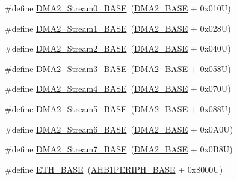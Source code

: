 \begin{DoxyCompactItemize}
\item 
\#define \hyperlink{group___peripheral__memory__map_gac4c67b24726ba6b94d03adb351bcec4d}{D\+M\+A2\+\_\+\+Stream0\+\_\+\+B\+A\+SE}~(\hyperlink{group___peripheral__memory__map_gab72a9ae145053ee13d1d491fb5c1df64}{D\+M\+A2\+\_\+\+B\+A\+SE} + 0x010\+U)
\item 
\#define \hyperlink{group___peripheral__memory__map_ga35512bdc3f5e9df4557c2fbe7935d0b1}{D\+M\+A2\+\_\+\+Stream1\+\_\+\+B\+A\+SE}~(\hyperlink{group___peripheral__memory__map_gab72a9ae145053ee13d1d491fb5c1df64}{D\+M\+A2\+\_\+\+B\+A\+SE} + 0x028\+U)
\item 
\#define \hyperlink{group___peripheral__memory__map_gaed33a06f08188466f2ede06160984e9a}{D\+M\+A2\+\_\+\+Stream2\+\_\+\+B\+A\+SE}~(\hyperlink{group___peripheral__memory__map_gab72a9ae145053ee13d1d491fb5c1df64}{D\+M\+A2\+\_\+\+B\+A\+SE} + 0x040\+U)
\item 
\#define \hyperlink{group___peripheral__memory__map_gaf3a9480e08c6ae94f4482e0cdaebdd17}{D\+M\+A2\+\_\+\+Stream3\+\_\+\+B\+A\+SE}~(\hyperlink{group___peripheral__memory__map_gab72a9ae145053ee13d1d491fb5c1df64}{D\+M\+A2\+\_\+\+B\+A\+SE} + 0x058\+U)
\item 
\#define \hyperlink{group___peripheral__memory__map_gad1e67740e6301233473f64638145dd1f}{D\+M\+A2\+\_\+\+Stream4\+\_\+\+B\+A\+SE}~(\hyperlink{group___peripheral__memory__map_gab72a9ae145053ee13d1d491fb5c1df64}{D\+M\+A2\+\_\+\+B\+A\+SE} + 0x070\+U)
\item 
\#define \hyperlink{group___peripheral__memory__map_gaed1460fdc407b6decfbffccb0260d0af}{D\+M\+A2\+\_\+\+Stream5\+\_\+\+B\+A\+SE}~(\hyperlink{group___peripheral__memory__map_gab72a9ae145053ee13d1d491fb5c1df64}{D\+M\+A2\+\_\+\+B\+A\+SE} + 0x088\+U)
\item 
\#define \hyperlink{group___peripheral__memory__map_ga5e81174c96fd204fa7c82c815e85c8e6}{D\+M\+A2\+\_\+\+Stream6\+\_\+\+B\+A\+SE}~(\hyperlink{group___peripheral__memory__map_gab72a9ae145053ee13d1d491fb5c1df64}{D\+M\+A2\+\_\+\+B\+A\+SE} + 0x0\+A0\+U)
\item 
\#define \hyperlink{group___peripheral__memory__map_gaa9faa708ad2440d24eb1064cba9bb06d}{D\+M\+A2\+\_\+\+Stream7\+\_\+\+B\+A\+SE}~(\hyperlink{group___peripheral__memory__map_gab72a9ae145053ee13d1d491fb5c1df64}{D\+M\+A2\+\_\+\+B\+A\+SE} + 0x0\+B8\+U)
\item 
\#define \hyperlink{group___peripheral__memory__map_gad965a7b1106ece575ed3da10c45c65cc}{E\+T\+H\+\_\+\+B\+A\+SE}~(\hyperlink{group___peripheral__memory__map_ga811a9a4ca17f0a50354a9169541d56c4}{A\+H\+B1\+P\+E\+R\+I\+P\+H\+\_\+\+B\+A\+SE} + 0x8000\+U)

\end{DoxyCompactItemize}
